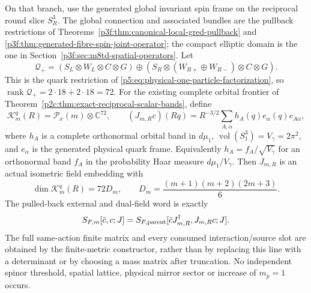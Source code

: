 \documentclass[12pt,a4paper]{article}
\begin{document}
\begin{theorem}
\label{p10:thm:v2189-native-orbital-quark-constructor}
On that branch, use the generated global invariant spin frame on the
reciprocal round slice $S_R^3$. The global connection and associated bundles
are the pullback restrictions of
Theorems~\ref{p3f:thm:canonical-local-gred-pullback} and
\ref{p3f:thm:generated-fibre-spin-joint-operator}; the compact elliptic
domain is the one in Section~\ref{p3f:sec:m8td-spatial-operators}.
Let
\[
 \mathcal Q_+
 =(S_L\otimes W_L\otimes C\otimes G)
 \oplus
 (S_R\otimes(W_{R+}\oplus W_{R-})\otimes C\otimes G).
\]
This is the quark restriction of
\eqref{p5:eq:physical-one-particle-factorization}, so
$\operatorname{rank}\mathcal Q_+=2\cdot18+2\cdot18=72$.
For the existing complete orbital frontier of
Theorem~\ref{p2c:thm:exact-reciprocal-scalar-bands}, define
\[
 \mathcal K_m^q(R)=\mathcal P_x(m)\otimes\mathbb C^{72},\qquad
 (J_{m,R}c)(Rq)=R^{-3/2}\sum_{A,\alpha}
        h_A(q)e_\alpha(q)c_{A\alpha},
\]
where $h_A$ is a complete orthonormal orbital band in $d\mu_1$,
$\operatorname{vol}(S_1^3)=V_\gamma=2\pi^2$, and $e_\alpha$ is the generated
physical quark frame. Equivalently $h_A=f_A/\sqrt{V_\gamma}$ for an
orthonormal band $f_A$ in the probability Haar measure $d\mu_1/V_\gamma$.
Then $J_{m,R}$ is an actual isometric field embedding with
\[
 \boxed{\dim\mathcal K_m^q(R)
 =72D_m,
 \qquad D_m=\frac{(m+1)(m+2)(2m+3)}6.}
\]
The pulled-back external and dual-field word is exactly
\[
 S_{F,m}[\bar c,c;J]
 =S_{F,\rm parent}[\bar cJ_{m,R}^{\dagger},J_{m,R}c;J].
\]
The full same-action finite matrix and every consumed interaction/source
slot are obtained by the finite-metric constructor, rather than by replacing
this line with a determinant or by choosing a mass matrix after truncation.
No independent spinor threshold, spatial lattice, physical mirror sector or
increase of $m_p=1$ occurs.
\end{theorem}
\end{document}
